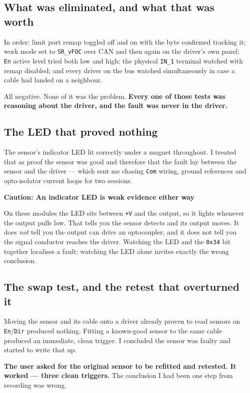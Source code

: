 \documentclass[11pt,letterpaper]{article}
\newenvironment{caution}[1]{%
    \par\addvspace{8pt}%
    \noindent{\color{cautionred}\rule{\linewidth}{0.8pt}}\par\vspace{2pt}
    \noindent\textbf{\color{cautionred}Caution: #1}\par\vspace{2pt}
}{%
    \par\vspace{2pt}\noindent{\color{cautionred}\rule{\linewidth}{0.4pt}}%
    \par\addvspace{8pt}%
}
\begin{document}
\subsection{What was eliminated, and what that was worth}
In order: limit port remap toggled off and on with the byte confirmed tracking
it; work mode set to \texttt{SR\_vFOC} over CAN and then again on the driver's
own panel; \texttt{En} active level tried both low and high; the physical
\texttt{IN\_1} terminal watched with remap disabled; and every driver on the bus
watched simultaneously in case a cable had landed on a neighbour.

All negative. None of it was the problem. \textbf{Every one of those tests was
reasoning about the driver, and the fault was never in the driver.}

\subsection{The LED that proved nothing}
The sensor's indicator LED lit correctly under a magnet throughout. I treated
that as proof the sensor was good and therefore that the fault lay between the
sensor and the driver --- which sent me chasing \texttt{Com} wiring, ground
references and opto-isolator current loops for two sessions.

\begin{caution}{An indicator LED is weak evidence either way}
On these modules the LED sits between \texttt{+V} and the output, so it lights
whenever the output pulls low. That tells you the sensor detects and its output
moves. It does \emph{not} tell you the output can drive an optocoupler, and it
does not tell you the signal conductor reaches the driver. Watching the LED and
the \texttt{0x34} bit together localises a fault; watching the LED alone invites
exactly the wrong conclusion.
\end{caution}

\subsection{The swap test, and the retest that overturned it}
Moving the sensor and its cable onto a driver already proven to read sensors on
\texttt{En}/\texttt{Dir} produced nothing. Fitting a known-good sensor to the
same cable produced an immediate, clean trigger. I concluded the sensor was
faulty and started to write that up.

\textbf{The user asked for the original sensor to be refitted and retested. It
worked --- three clean triggers.} The conclusion I had been one step from
recording was wrong.
\end{document}
